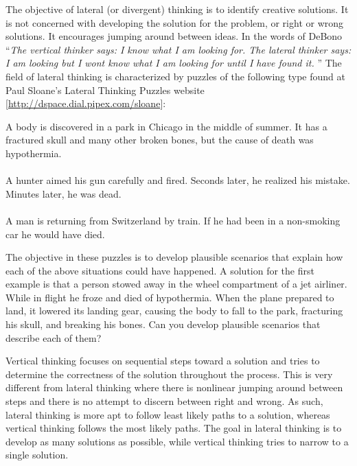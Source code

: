 The objective of lateral (or divergent) thinking is to identify creative
solutions. It is not concerned with developing the solution for the
problem, or right or wrong solutions. It encourages jumping around
be­tween ideas. In the words of DeBono ``\emph{The vertical thinker says:
\textquotesingle I know what I am looking for.\textquotesingle{} The
lateral thinker says: \textquotesingle I am looking but I
won\textquotesingle t know what I am looking for until I have found
it.\textquotesingle{}} '' The field of lateral thinking is characterized
by puzzles of the following type found at Paul Sloane's Lateral Thinking
Puzzles website {[}\url{http://dspace.dial.pipex.com/sloane}{]}:

\begin{itquote}
A body is discovered in a park in Chicago in the middle of summer. It
has a fractured skull and many other broken bones, but the cause of
death was hypothermia.\\ \\

A hunter aimed his gun carefully and fired. Seconds later, he realized
his mistake. Minutes later, he was dead.\\ \\

A man is returning from Switzerland by train. If he had been in a
non-smoking car he would have died.
\end{itquote}

The objective in these puzzles is to develop plausible scenarios that
explain how each of the above situations could have happened. A solution
for the first example is that a person stowed away in the wheel
compartment of a jet airliner. While in flight he froze and died of
hypo­thermia. When the plane prepared to land, it lowered its landing
gear, causing the body to fall to the park, fracturing his skull, and
breaking his bones. Can you develop plausible scenarios that describe
each of them?

Vertical thinking focuses on sequential steps toward a solution and
tries to determine the correctness of the solution throughout the
process. This is very different from lateral thinking where there is
nonlinear jumping around between steps and there is no attempt to
discern be­tween right and wrong. As such, lateral thinking is more apt
to follow least likely paths to a solution, whereas vertical thinking
follows the most likely paths. The goal in lateral thinking is to
develop as many solutions as possible, while vertical thinking tries to
narrow to a single solution.

